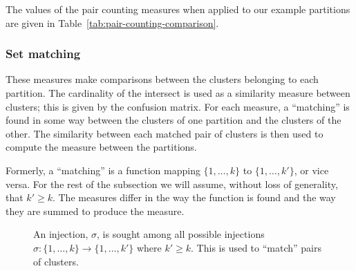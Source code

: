 \documentclass[a4paper]{report}
\begin{document}
The values of the pair counting measures when applied to our example
partitions are given in Table~\ref{tab:pair-counting-comparison}.

\subsubsection{Set matching}
\label{sec:set-matching}

These measures make comparisons between the clusters belonging to each
partition.  The cardinality of the intersect is used as a similarity measure
between clusters; this is given by the confusion matrix.  For each measure, a
``matching'' is found in some way between the clusters of one partition and
the clusters of the other.  The similarity between each matched pair of
clusters is then used to compute the measure between the partitions.

Formerly, a ``matching'' is a function mapping $\{1,\dotsc,k\}$ to
$\{1,\dotsc,k'\}$, or vice versa.  For the rest of the subsection we will
assume, without loss of generality, that $k' \geq k$.  The measures differ in
the way the function is found and the way they are summed to produce the
measure.

\begin{figure}
  \Centering
  \caption{An injection, $\sigma$, is sought among all possible injections
    $\sigma \colon \{1,\dotsc,k\} \to \{1,\dotsc,k'\}$ where $k' \geq k$.
    This is used to ``match'' pairs of clusters.}
  \label{fig:matching}
\end{figure}
\end{document}
